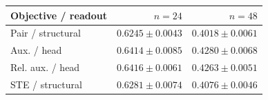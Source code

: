 \begin{tabular*}{\linewidth}{@{\extracolsep{\fill}}lrr}
\toprule
Objective / readout & $n=24$ & $n=48$ \\
\midrule
Pair / structural & $0.6245\pm0.0043$ & $0.4018\pm0.0061$ \\
Aux. / head & $0.6414\pm0.0085$ & $0.4280\pm0.0068$ \\
Rel. aux. / head & $0.6416\pm0.0061$ & $0.4263\pm0.0051$ \\
STE / structural & $0.6281\pm0.0074$ & $0.4076\pm0.0046$ \\
\bottomrule
\end{tabular*}
